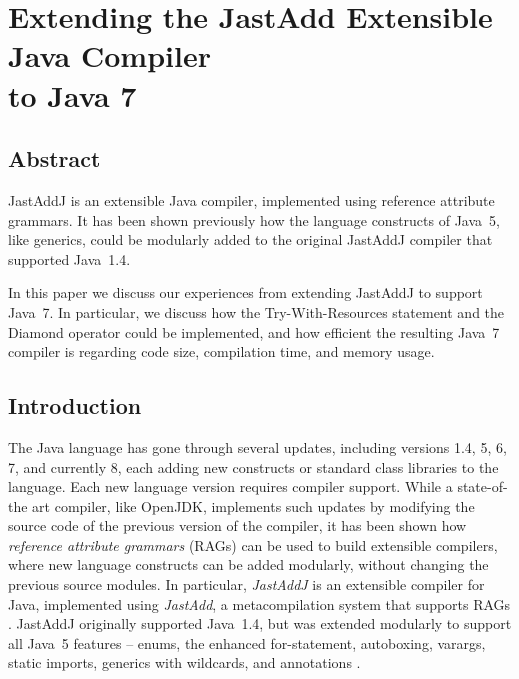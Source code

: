 \chapter[Extending the JastAdd Extensible Java Compiler to Java 7]{\texorpdfstring{%
Extending the JastAdd Extensible Java Compiler\\to Java 7}{%
Extending the JastAdd Extensible Java Compiler to Java 7}}
\label{ch:java7}
\paperRemark{\paperIref}

{

\section*{Abstract}

JastAddJ is an extensible Java compiler, implemented using reference attribute
grammars. It has been shown previously how the language constructs of Java~5,
like generics, could be modularly added to the original JastAddJ compiler that
supported Java~1.4.

In this paper we discuss our experiences from extending JastAddJ to support
Java~7. In particular, we discuss how the Try-With-Resources statement and the
Diamond operator could be implemented, and how efficient the resulting Java~7
compiler is regarding code size, compilation time, and memory usage.

\section{Introduction}

The Java language has gone through several updates, including versions 1.4, 5, 6, 7,
and currently 8, each adding new constructs or standard class libraries to the
language. Each new language version requires compiler support.  While a
state-of-the art compiler, like OpenJDK, implements such updates by modifying
the source code of the previous version of the compiler, it has been shown how
\emph{reference attribute grammars} \cite{DBLP:journals/informaticaSI/Hedin00} (RAGs) can be used to
build extensible compilers, where new language constructs can be added
modularly, without changing the previous source modules. In particular,
\emph{JastAddJ} is an extensible compiler for Java, implemented using
\emph{JastAdd}, a metacompilation system that supports RAGs \cite{jastadd}.
JastAddJ originally supported Java~1.4, but was extended modularly to support
all Java~5 features -- enums, the enhanced for-statement, autoboxing, varargs,
static imports, generics with wildcards, and annotations \cite{jastaddj}.

}
